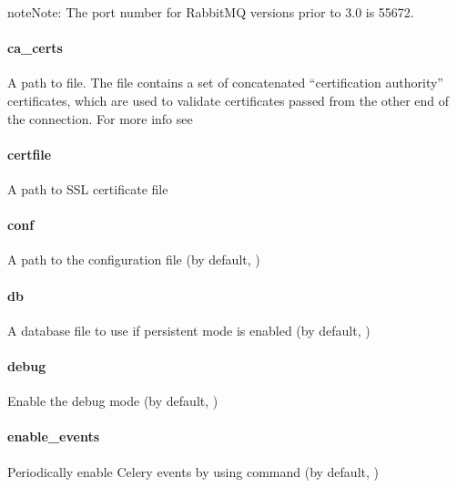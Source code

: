 \documentclass[letterpaper,10pt,english]{sphinxmanual}
\begin{document}
\begin{sphinxadmonition}{note}{Note:}
The port number for RabbitMQ versions prior to 3.0 is 55672.
\end{sphinxadmonition}


\paragraph{ca\_certs}
\label{\detokenize{config:ca-certs}}\label{\detokenize{config:id6}}
A path to  file. The  file contains a set of concatenated “certification authority”
certificates, which are used to validate certificates passed from the other end of the connection.
For more info see 


\paragraph{certfile}
\label{\detokenize{config:certfile}}\label{\detokenize{config:id7}}
A path to SSL certificate file


\paragraph{conf}
\label{\detokenize{config:conf}}\label{\detokenize{config:id8}}
A path to the configuration file (by default, )


\paragraph{db}
\label{\detokenize{config:db}}\label{\detokenize{config:id9}}
A database file to use if persistent mode is enabled
(by default, )


\paragraph{debug}
\label{\detokenize{config:debug}}\label{\detokenize{config:id10}}
Enable the debug mode (by default, )


\paragraph{enable\_events}
\label{\detokenize{config:enable-events}}\label{\detokenize{config:id11}}
Periodically enable Celery events by using  command
(by default, )
\end{document}
